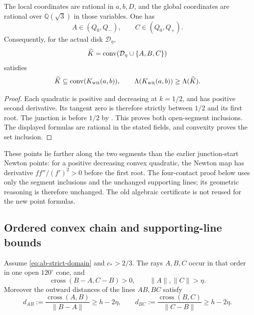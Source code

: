 \begin{lemma}
\label{lem:technical-newton-reduction}
The local coordinates are rational in $a,b,D$, and the global coordinates
are rational over $\mathbb Q(\sqrt3)$ in those variables.  One has
\[
 A\in(Q_0,Q_-),\qquad C\in(Q_0,Q_+).
\]
Consequently, for the actual disk $\mathcal D_\eta$,
\[
 \widehat K=\mathrm{conv}(\mathcal D_\eta\cup\{A,B,C\})
\]
satisfies
\begin{equation}
 \widehat K\subseteq\mathrm{conv}(K_{\rm wit}(a,b)),\qquad
 \Lambda(K_{\rm wit}(a,b))\ge\Lambda(\widehat K).
 \label{eq:reader-newton-reduction}
\end{equation}
\end{lemma}
\begin{proof}
Each quadratic is positive and decreasing at $k=1/2$, and has positive
second derivative. Its tangent zero is therefore strictly between
$1/2$ and its first root.  The junction is before $1/2$ by
.  This proves both open-segment inclusions.
The displayed formulas are rational in the stated fields, and convexity
proves the set inclusion.
\end{proof}

These points lie farther along the two segments than the earlier
junction-start Newton points: for a positive decreasing convex quadratic,
the Newton map has derivative $ff''/(f')^2>0$ before the first root.
The four-contact proof below uses only the segment inclusions and the
unchanged supporting lines; its geometric reasoning is therefore unchanged.
The old algebraic certificate is not reused for the new point formulas.

\subsection{Ordered convex chain and supporting-line bounds}

\begin{proposition}
\label{prop:technical-four-contact-geometry}
Assume \eqref{eq:ab-strict-domain} and $c_*>2/3$. The rays $A,B,C$ occur
in that order in one open $120^\circ$ cone, and
\[
 \operatorname{cross}(B-A,C-B)>0,\qquad
 \|A\|,\|C\|>\eta.
\]
Moreover the outward distances of the lines $AB,BC$ satisfy
\begin{equation}
 d_{AB}:=\frac{\operatorname{cross}(A,B)}{\|B-A\|}\ge h-2\eta,\qquad
 d_{BC}:=\frac{\operatorname{cross}(B,C)}{\|C-B\|}\ge h-2\eta.
 \label{eq:adjacent-overlaps}
\end{equation}
\end{proposition}

